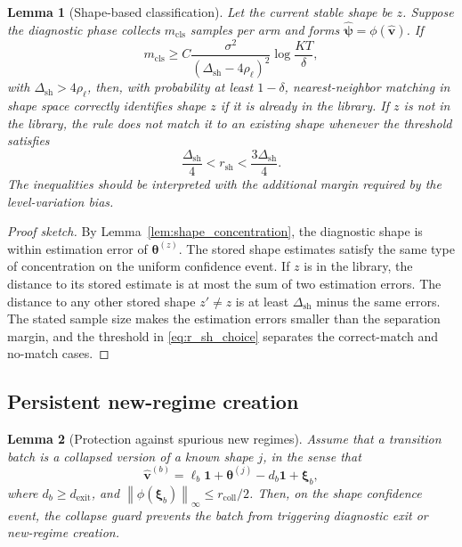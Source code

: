 \documentclass[11pt]{article}
\newtheorem{lemma}{Lemma}
\newcommand{\one}{\bm 1}
\newcommand{\norm}[1]{\left\lVert #1 \right\rVert}
\begin{document}
\begin{lemma}[Shape-based classification]
\label{lem:shape_classification}
Let the current stable shape be $z$. Suppose the diagnostic phase collects $m_{\mathrm{cls}}$ samples per arm and forms $\widehat{\bm\psi}=\phi(\widehat{\bm v})$. If
\begin{equation}
\label{eq:m_cls_requirement}
m_{\mathrm{cls}}
\geq
C
\frac{\sigma^2}{(\Delta_{\mathrm{sh}}-4\rho_{\ell})^2}
\log\frac{KT}{\delta},
\end{equation}
with $\Delta_{\mathrm{sh}}>4\rho_{\ell}$, then, with probability at least $1-\delta$, nearest-neighbor matching in shape space correctly identifies shape $z$ if it is already in the library. If $z$ is not in the library, the rule does not match it to an existing shape whenever the threshold satisfies
\begin{equation}
\label{eq:r_sh_choice}
\frac{\Delta_{\mathrm{sh}}}{4}
<
r_{\mathrm{sh}}
<
\frac{3\Delta_{\mathrm{sh}}}{4}.
\end{equation}
The inequalities should be interpreted with the additional margin required by the level-variation bias.
\end{lemma}

\begin{proof}[Proof sketch]
By Lemma~\ref{lem:shape_concentration}, the diagnostic shape is within estimation error of $\bm\theta^{(z)}$. The stored shape estimates satisfy the same type of concentration on the uniform confidence event. If $z$ is in the library, the distance to its stored estimate is at most the sum of two estimation errors. The distance to any other stored shape $z'\neq z$ is at least $\Delta_{\mathrm{sh}}$ minus the same errors. The stated sample size makes the estimation errors smaller than the separation margin, and the threshold in \eqref{eq:r_sh_choice} separates the correct-match and no-match cases.
\end{proof}

\subsection{Persistent new-regime creation}
\label{subsec:persistence_proof}

\begin{lemma}[Protection against spurious new regimes]
\label{lem:no_spurious_new_regimes}
Assume that a transition batch is a collapsed version of a known shape $j$, in the sense that
\begin{equation}
\label{eq:collapsed_known_shape}
\widehat{\bm v}^{(b)}
=
\ell_b\one+
\bm\theta^{(j)}
-
d_b\one+
\bm\xi_b,
\end{equation}
where $d_b\geq d_{\mathrm{exit}}$, and $\norm{\phi(\bm\xi_b)}_{\infty}\leq r_{\mathrm{coll}}/2$. Then, on the shape confidence event, the collapse guard prevents the batch from triggering diagnostic exit or new-regime creation.
\end{lemma}
\end{document}
